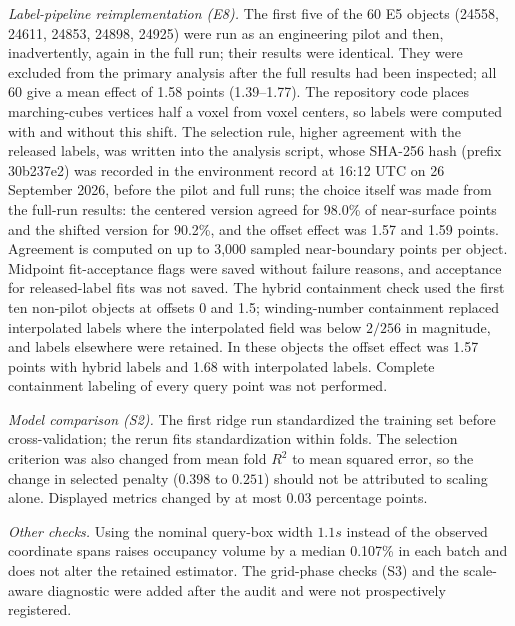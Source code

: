 \documentclass[journal]{IEEEtran}
\begin{document}
\emph{Label-pipeline reimplementation (E8).} The first five of the 60 E5 objects (24558, 24611, 24853, 24898, 24925) were run as an engineering pilot and then, inadvertently, again in the full run; their results were identical. They were excluded from the primary analysis after the full results had been inspected; all 60 give a mean effect of 1.58 points (1.39--1.77). The repository code places marching-cubes vertices half a voxel from voxel centers, so labels were computed with and without this shift. The selection rule, higher agreement with the released labels, was written into the analysis script, whose SHA-256 hash (prefix 30b237e2) was recorded in the environment record at 16:12 UTC on 26 September 2026, before the pilot and full runs; the choice itself was made from the full-run results: the centered version agreed for 98.0\% of near-surface points and the shifted version for 90.2\%, and the offset effect was 1.57 and 1.59 points. Agreement is computed on up to 3,000 sampled near-boundary points per object. Midpoint fit-acceptance flags were saved without failure reasons, and acceptance for released-label fits was not saved. The hybrid containment check used the first ten non-pilot objects at offsets 0 and 1.5; winding-number containment replaced interpolated labels where the interpolated field was below $2/256$ in magnitude, and labels elsewhere were retained. In these objects the offset effect was 1.57 points with hybrid labels and 1.68 with interpolated labels. Complete containment labeling of every query point was not performed.

\emph{Model comparison (S2).} The first ridge run standardized the training set before cross-validation; the rerun fits standardization within folds. The selection criterion was also changed from mean fold $R^2$ to mean squared error, so the change in selected penalty ($0.398$ to $0.251$) should not be attributed to scaling alone. Displayed metrics changed by at most 0.03 percentage points.

\emph{Other checks.} Using the nominal query-box width $1.1s$ instead of the observed coordinate spans raises occupancy volume by a median 0.107\% in each batch and does not alter the retained estimator. The grid-phase checks (S3) and the scale-aware diagnostic were added after the audit and were not prospectively registered.



\end{document}
